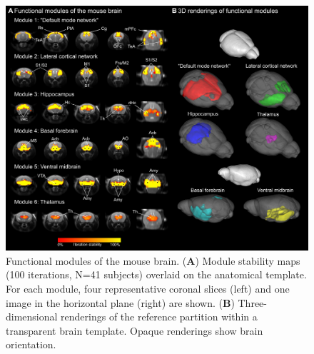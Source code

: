 \begin{figure}[th]
    \centering
    \includegraphics[scale=0.8]{figures/hubs_figure_01_modules_NEW.png}
    \decoRule
    \caption[Functional modules of the mouse brain.]{Functional modules of the
    mouse brain. (\textbf{A}) Module stability maps (100 iterations, N=41
    subjects) overlaid on the anatomical template. For each module, four
    representative coronal slices (left) and one image in the horizontal plane
    (right) are shown. (\textbf{B}) Three-dimensional renderings of the
    reference partition within a transparent brain template. Opaque renderings
    show brain orientation.}
    \label{fig:hubs_fig01_modules}
\end{figure}

